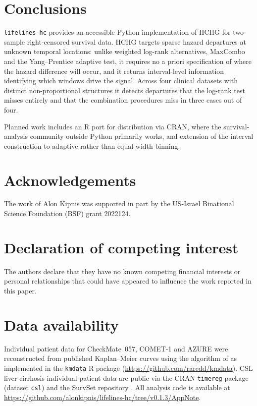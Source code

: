 \documentclass[11pt]{article}
\begin{document}
\section{Conclusions}

\texttt{lifelines-hc} provides an accessible Python implementation of HCHG
for two-sample right-censored survival data. HCHG targets sparse hazard
departures at unknown temporal locations: unlike weighted log-rank
alternatives, MaxCombo and the Yang--Prentice adaptive test, it requires no
a priori specification of where the hazard difference will occur, and it
returns interval-level information identifying which windows drive the
signal. Across four clinical datasets with distinct non-proportional
structures it detects departures that the log-rank test misses entirely and
that the combination procedures miss in three cases out of four.

Planned work includes an R port for distribution via CRAN, where the
survival-analysis community outside Python primarily works, and extension
of the interval construction to adaptive rather than equal-width binning.

\section*{Acknowledgements}

The work of Alon Kipnis was supported in part by the US-Israel Binational
Science Foundation (BSF) grant 2022124.

\section*{Declaration of competing interest}
The authors declare that they have no known competing financial interests
or personal relationships that could have appeared to influence the work
reported in this paper.

\section*{Data availability}
Individual patient data for CheckMate~057, COMET-1 and AZURE were
reconstructed from published Kaplan--Meier curves using the algorithm of
\citet{guyot2012} as implemented in the \texttt{kmdata} R package
(\url{https://github.com/raredd/kmdata}). CSL liver-cirrhosis individual
patient data are public via the CRAN \texttt{timereg} package (dataset
\texttt{csl}) and the SurvSet repository \citep{survset2022}. All analysis
code is available at
\url{https://github.com/alonkipnis/lifelines-hc/tree/v0.1.3/AppNote}.


\end{document}
